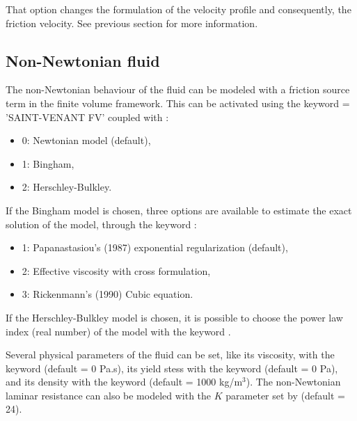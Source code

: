 That option changes the formulation of the velocity profile and consequently,
the friction velocity. See previous section for more information.

\subsection{Non-Newtonian fluid}

The non-Newtonian behaviour of the fluid can be modeled with a friction
source term in the finite volume framework. This can be activated using the
keyword  = 'SAINT-VENANT FV' coupled with
:
\begin{itemize}
  \item 0: Newtonian model (default),
  \item 1: Bingham,
  \item 2: Herschley-Bulkley.
\end{itemize}

If the Bingham model is chosen, three options are available to estimate
the exact solution of the model, through the keyword :
\begin{itemize}
  \item 1: Papanastasiou's (1987) \cite{papanastasiou1987flows} exponential
    regularization (default),
  \item 2: Effective viscosity with cross formulation,
  \item 3: Rickenmann's (1990) \cite{rickenmann1990bedload} Cubic equation.
\end{itemize}

If the Herschley-Bulkley model is chosen, it is possible to choose the power
law index (real number) of the model with the keyword
.

Several physical parameters of the fluid can be set, like its viscosity,
with the keyword  (default = 0 Pa.s), its
yield stess with the keyword  (default =
0 Pa), and its density with the keyword 
(default = 1000 kg/m$^3$). The non-Newtonian laminar resistance can also be modeled
with the $K$ parameter set by
 (default = 24).

